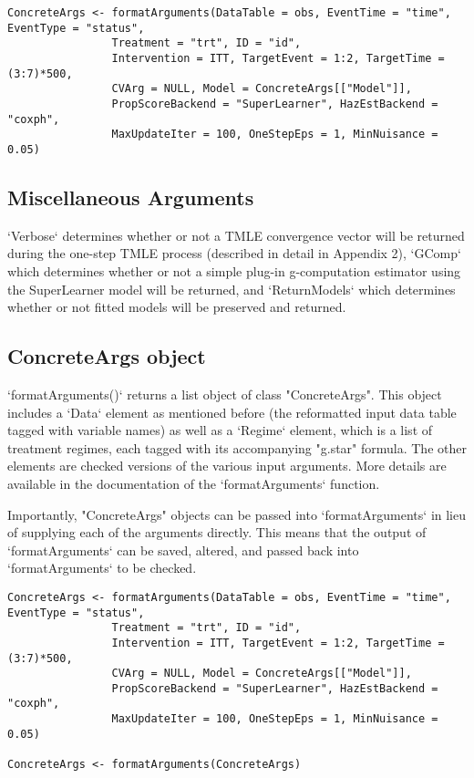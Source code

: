 \documentclass{report}
\newcommand{\1}{\ensuremath{\mathbf{1}}}
\begin{document}
\begin{lstlisting}
ConcreteArgs <- formatArguments(DataTable = obs, EventTime = "time", EventType = "status", 
				Treatment = "trt", ID = "id", 
				Intervention = ITT, TargetEvent = 1:2, TargetTime = (3:7)*500, 
				CVArg = NULL, Model = ConcreteArgs[["Model"]], 
				PropScoreBackend = "SuperLearner", HazEstBackend = "coxph", 
				MaxUpdateIter = 100, OneStepEps = 1, MinNuisance = 0.05)
\end{lstlisting}

\subsection{Miscellaneous Arguments}
`Verbose` determines whether or not a TMLE convergence vector will be returned during the one-step TMLE process (described in detail in Appendix 2), `GComp` which determines whether or not a simple plug-in g-computation estimator using the SuperLearner model will be returned, and `ReturnModels` which determines whether or not fitted models will be preserved and returned.

\subsection{ConcreteArgs object}
`formatArguments()` returns a list object of class "ConcreteArgs". This object includes a `Data` element as mentioned before (the reformatted input data table tagged with variable names) as well as a `Regime` element, which is a list of treatment regimes, each tagged with its accompanying "g.star" formula. The other elements are checked versions of the various input arguments. More details are available in the documentation of the `formatArguments` function.

Importantly, "ConcreteArgs" objects can be passed into `formatArguments` in lieu of supplying each of the arguments directly. This means that the output of `formatArguments` can be saved, altered, and passed back into `formatArguments` to be checked.

\begin{lstlisting}
ConcreteArgs <- formatArguments(DataTable = obs, EventTime = "time", EventType = "status", 
				Treatment = "trt", ID = "id", 
				Intervention = ITT, TargetEvent = 1:2, TargetTime = (3:7)*500, 
				CVArg = NULL, Model = ConcreteArgs[["Model"]], 
				PropScoreBackend = "SuperLearner", HazEstBackend = "coxph", 
				MaxUpdateIter = 100, OneStepEps = 1, MinNuisance = 0.05)

ConcreteArgs <- formatArguments(ConcreteArgs)
\end{lstlisting}
\end{document}
